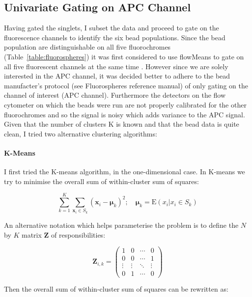 \subsection{Univariate Gating on APC Channel}

Having gated the singlets, I subset the data and proceed to gate on the fluorescence channels to identify the six bead populations.
Since the bead population are distinguishable on all five fluorochromes (Table~\ref{table:fluorospheres}) it was first considered to use flowMeans to gate on all five fluorescent channels at the same time \citep{Aghaeepour:2010fv}.
However since we are solely interested in the APC channel, it was decided better to adhere to the bead manufacter's protocol (see Fluorospheres reference manual) of only gating on the channel of interest (APC channel).
Furthermore the detectors on the flow cytometer on which the beads were run are not properly calibrated for the other fluorochromes and so the signal is noisy which adds variance to the APC signal.
Given that the number of clusters K is known and that the bead data is quite clean, I tried two alternative clustering algorithms:

\paragraph{K-Means}

I first tried the K-means algorithm, in the one-dimensional case.
In K-means we try to minimise the overall sum of within-cluster sum of squares:

\[
    \sum_{k=1}^{K} \sum_{\mathbf x_i \in S_k} ( \mathbf x_i - \boldsymbol\mu_k )^2 ; \quad \boldsymbol\mu_k=\text{E}(x_i| x_i \in S_k)
\]

An alternative notation which helps parameterise the problem is to define the $N$ by $K$ matrix $\mathbf Z$ of responsibilities:

\[
\mathbf Z_{i,k} =
 \begin{pmatrix}
  1 & 0 & \cdots & 0 \\
  0 & 0 & \cdots & 1 \\
  \vdots  & \vdots  & \ddots & \vdots  \\
  0 & 1 & \cdots & 0
 \end{pmatrix}
\]

Then the overall sum of within-cluster sum of squares can be rewritten as:

